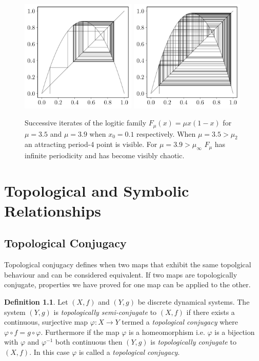\documentclass[11pt,a4paper,oneside]{memoir}
\theoremstyle{plain}
\theoremstyle{definition}
\newtheorem{defn}[thm]{Definition}
\begin{document}
\begin{figure}[h]
    \centering
    \includegraphics[width=5.5cm]{cobweb_0.1_3.5.pdf}
    \includegraphics[width=5.5cm]{cobweb_0.1_3.9.pdf}
    \caption{Successive iterates of the logitic family $F_{\mu}(x) = \mu x(1-x)$ for $\mu = 3.5$ and $\mu = 3.9$ when $x_0 = 0.1$ respectively. When $\mu = 3.5 > \mu_2$ an attracting period-4 point is visible. For $\mu = 3.9 > \mu_\infty$ $F_\mu$ has infinite periodicity and has become visibly chaotic.}
    \label{fig:cobweb_3.5_3.9}
\end{figure}

\chapter{Topological and Symbolic Relationships} \label{chap:conjugacy-symbol-dynamics}

\section{Topological Conjugacy}
Topological conjugacy defines when two maps that exhibit the same topolgical behaviour and can be considered equivalent. If two maps are topologically conjugate, properties we have proved for one map can be applied to the other.

\begin{defn} \label{defn:topological-conjugacy}
    Let $(X, f)$ and $(Y, g)$ be discrete dynamical systems. The system $(Y, g)$ is \emph{topologically semi-conjugate} to $(X, f)$ if there exists a continuous, surjective map $\varphi: X \to Y$ termed a \emph{topological conjugacy} where $\varphi \circ f = g \circ \varphi$. Furthermore if the map $\varphi$ is a homeomorphism i.e. $\varphi$ is a bijection with $\varphi$ and $\varphi^{-1}$ both continuous then $(Y, g)$ is \emph{topologically conjugate} to $(X, f)$. In this case $\varphi$ is called a \emph{topological conjugacy}.
\end{defn}
\end{document}
